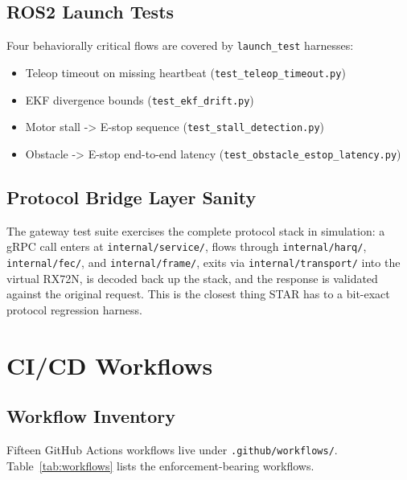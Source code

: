 \documentclass[11pt,letterpaper]{article}
\begin{document}
\subsection{ROS2 Launch Tests}
Four behaviorally critical flows are covered by
\texttt{launch\_test} harnesses:
\begin{itemize}[leftmargin=1.4em,itemsep=2pt]
\item Teleop timeout on missing heartbeat
      (\texttt{test\_teleop\_timeout.py})
\item EKF divergence bounds
      (\texttt{test\_ekf\_drift.py})
\item Motor stall -> E-stop sequence
      (\texttt{test\_stall\_detection.py})
\item Obstacle -> E-stop end-to-end latency
      (\texttt{test\_obstacle\_estop\_latency.py})
\end{itemize}

\subsection{Protocol Bridge Layer Sanity}
The gateway test suite exercises the complete protocol stack in
simulation: a gRPC call enters at \texttt{internal/service/},
flows through \texttt{internal/harq/}, \texttt{internal/fec/}, and
\texttt{internal/frame/}, exits via \texttt{internal/transport/}
into the virtual RX72N, is decoded back up the stack, and the
response is validated against the original request. This is the
closest thing STAR has to a bit-exact protocol regression harness.

\section{CI/CD Workflows}
\label{sec:ci}

\subsection{Workflow Inventory}
Fifteen GitHub Actions workflows live under
\texttt{.github/workflows/}. Table~\ref{tab:workflows} lists the
enforcement-bearing workflows.
\end{document}
